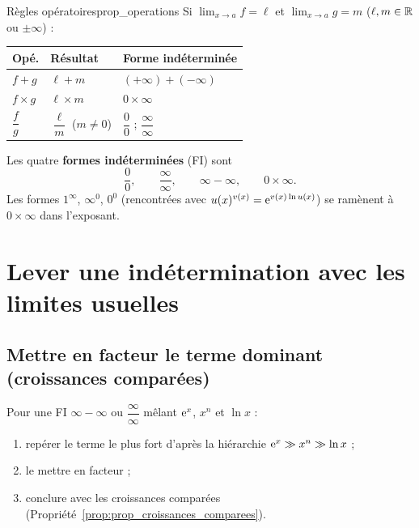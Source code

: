 \begin{propriete}{Règles opératoires}{prop_operations}
	Si $\displaystyle\lim_{x\to a}f=\ell$ et $\displaystyle\lim_{x\to a}g=m$
	($\ell,m\in\mathbb{R}$ ou $\pm\infty$) :
	\begin{center}
	\renewcommand{\arraystretch}{1.7}
	\begin{tabular}{>{\centering\arraybackslash}p{1.6cm}
	                >{\centering\arraybackslash}p{3.0cm}
	                >{\centering\arraybackslash}p{3.4cm}}
	\hline
	\textbf{Opé.} & \textbf{Résultat} & \textbf{Forme indéterminée} \\
	\hline
	$f+g$ & $\ell+m$ & $(+\infty)+(-\infty)$ \\
	$f\times g$ & $\ell\times m$ & $0\times\infty$ \\
	$\dfrac{f}{g}$ & $\dfrac{\ell}{m}$ ($m\neq 0$) &
	$\dfrac{0}{0}$ \quad ; \quad $\dfrac{\infty}{\infty}$ \\
	\hline
	\end{tabular}
	\end{center}
\end{propriete}

\begin{attention}
	Les quatre \textbf{formes indéterminées} (FI) sont
	\[
	\frac{0}{0},\qquad \frac{\infty}{\infty},\qquad
	\infty-\infty,\qquad 0\times\infty .
	\]
	Les formes $1^{\infty}$, $\infty^{0}$, $0^{0}$ (rencontrées avec
	$u(x)^{v(x)}=\mathrm{e}^{v(x)\ln u(x)}$) se ramènent à $0\times\infty$ dans
	l'exposant.
\end{attention}


\section{Lever une indétermination avec les limites usuelles}

\subsection{Mettre en facteur le terme dominant (croissances comparées)}

\begin{methode}
	Pour une FI $\infty-\infty$ ou $\dfrac{\infty}{\infty}$ mêlant
	$\mathrm{e}^x$, $x^n$ et $\ln x$ :
	\begin{enumerate}
		\item repérer le terme le plus fort d'après la hiérarchie
		$\mathrm{e}^x\gg x^n\gg\ln x$ ;
		\item le mettre en facteur ;
		\item conclure avec les croissances comparées
		(Propriété~\ref{prop:prop_croissances_comparees}).
	\end{enumerate}
\end{methode}

